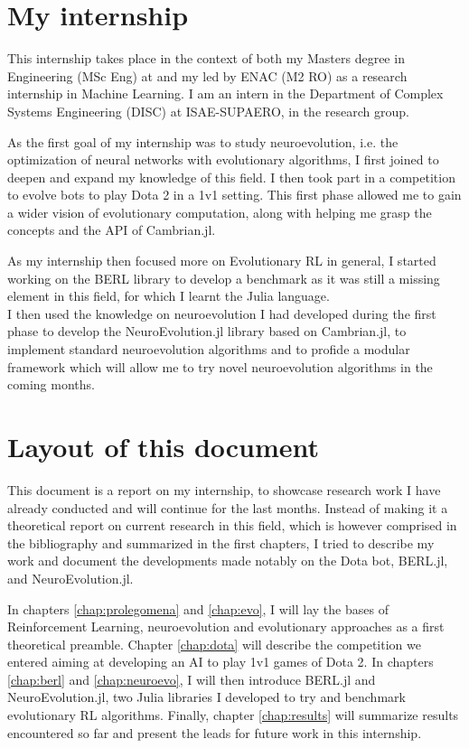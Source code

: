 \section*{My internship}

This internship takes place in the context of both my Masters degree in Engineering (MSc Eng) at  and my  led by ENAC (M2 RO) as a research internship in Machine Learning. I am an intern in the Department of Complex Systems Engineering (DISC) at ISAE-SUPAERO, in the  research group.

As the first goal of my internship was to study neuroevolution, i.e. the optimization of neural networks with evolutionary algorithms, I first joined  to deepen and expand my knowledge of this field. I then took part in a competition to evolve bots to play Dota 2 in a 1v1 setting. This first phase allowed me to gain a wider vision of evolutionary computation, along with helping me grasp the concepts and the API of Cambrian.jl.

As my internship then focused more on Evolutionary RL in general, I started working on the BERL library to develop a benchmark as it was still a missing element in this field, for which I learnt the Julia language. \\
I then used the knowledge on neuroevolution I had developed during the first phase to develop the NeuroEvolution.jl library based on Cambrian.jl, to implement standard neuroevolution algorithms and to profide a modular framework which will allow me to try novel neuroevolution algorithms in the coming months.

\section*{Layout of this document}

This document is a report on my internship, to showcase research work I have already conducted and will continue for the last months. Instead of making it a theoretical report on current research in this field, which is however comprised in the bibliography and summarized in the first chapters, I tried to describe my work and document the developments made notably on the Dota bot, BERL.jl, and NeuroEvolution.jl.

In chapters \ref{chap:prolegomena} and \ref{chap:evo}, I will lay the bases of Reinforcement Learning, neuroevolution and evolutionary approaches as a first theoretical preamble. Chapter \ref{chap:dota} will describe the competition we entered aiming at developing an AI to play 1v1 games of Dota 2. In chapters \ref{chap:berl} and \ref{chap:neuroevo}, I will then introduce BERL.jl and NeuroEvolution.jl, two Julia libraries I developed to try and benchmark evolutionary RL algorithms. 
Finally, chapter \ref{chap:results} will summarize results encountered so far and present the leads for future work in this internship.


